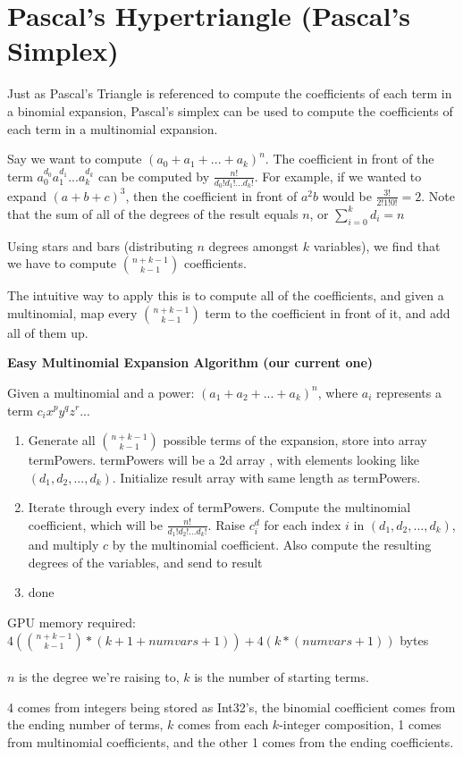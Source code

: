 \documentclass{article}
\begin{document}
\section{Pascal's Hypertriangle (Pascal's Simplex)}
Just as Pascal's Triangle is referenced to compute the coefficients of each term in a binomial expansion, Pascal's simplex can be used to compute the coefficients of each term in a multinomial expansion.

Say we want to compute $(a_0 + a_1 + ... + a_k)^n$. The coefficient in front of the term $a_0^{d_0}a_1^{d_1}...a_k^{d_k}$ can be computed by $\frac{n!}{d_0!d_1!...d_k!}$. For example, if we wanted to expand $(a + b + c)^3$, then the coefficient in front of $a^2 b$ would be $\frac{3!}{2!1!0!}=2$. Note that the sum of all of the degrees of the result equals $n$, or $\sum_{i=0}^{k} d_i=n$

Using stars and bars (distributing $n$ degrees amongst $k$ variables), we find that we have to compute $n + k - 1 \choose k-1$ coefficients.

The intuitive way to apply this is to compute all of the coefficients, and given a multinomial, map every $n + k - 1 \choose k-1$ term to the coefficient in front of it, and add all of them up.

\textbf{Easy Multinomial Expansion Algorithm (our current one)}

Given a multinomial and a power: $(a_1 + a_2 + ... + a_k)^n$, where $a_i$ represents a term $c_ix^py^qz^r...$

\begin{enumerate}
    \item Generate all $\binom{n+k-1}{k-1}$ possible terms of the expansion, store into array termPowers. termPowers will be a 2d array , with elements looking like $(d_1, d_2, ... , d_k)$. Initialize result array with same length as termPowers.
    \item Iterate through every index of termPowers. Compute the multinomial coefficient, which will be $\frac{n!}{d_1!d_2!...d_k!}$. Raise $c^d_i$ for each index $i$ in $(d_1, d_2, ... , d_k)$, and multiply $c$ by the multinomial coefficient. Also compute the resulting degrees of the variables, and send to result
    \item done
\end{enumerate}

GPU memory required: 
$4 (\binom{n + k - 1}{k - 1} * (k + 1 + numvars + 1)) + 4 (k * (numvars + 1))$ bytes \\\\
$n$ is the degree we're raising to, $k$ is the number of starting terms.

4 comes from integers being stored as Int32's, the binomial coefficient comes from the ending number of terms, $k$ comes from each $k$-integer composition, 1 comes from multinomial coefficients, and the other 1 comes from the ending coefficients.
\end{document}
